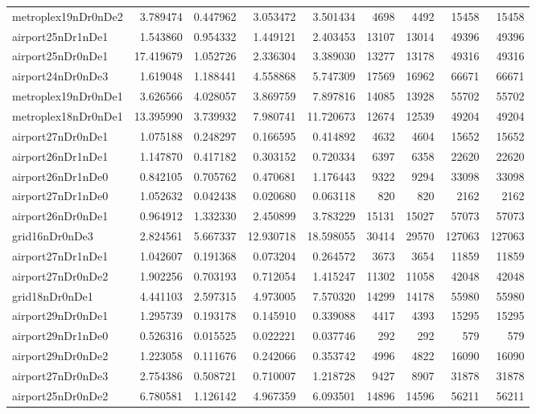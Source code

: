 \begin{longtable}{|l|r|r|r|r|r|r|r|r|}
metroplex19nDr0nDe2 & 3.789474 & 0.447962 & 3.053472 & 3.501434 & 4698 & 4492 & 15458 & 15458 \\
airport25nDr1nDe1 & 1.543860 & 0.954332 & 1.449121 & 2.403453 & 13107 & 13014 & 49396 & 49396 \\
airport25nDr0nDe1 & 17.419679 & 1.052726 & 2.336304 & 3.389030 & 13277 & 13178 & 49316 & 49316 \\
airport24nDr0nDe3 & 1.619048 & 1.188441 & 4.558868 & 5.747309 & 17569 & 16962 & 66671 & 66671 \\
metroplex19nDr0nDe1 & 3.626566 & 4.028057 & 3.869759 & 7.897816 & 14085 & 13928 & 55702 & 55702 \\
metroplex18nDr0nDe1 & 13.395990 & 3.739932 & 7.980741 & 11.720673 & 12674 & 12539 & 49204 & 49204 \\
airport27nDr0nDe1 & 1.075188 & 0.248297 & 0.166595 & 0.414892 & 4632 & 4604 & 15652 & 15652 \\
airport26nDr1nDe1 & 1.147870 & 0.417182 & 0.303152 & 0.720334 & 6397 & 6358 & 22620 & 22620 \\
airport26nDr1nDe0 & 0.842105 & 0.705762 & 0.470681 & 1.176443 & 9322 & 9294 & 33098 & 33098 \\
airport27nDr1nDe0 & 1.052632 & 0.042438 & 0.020680 & 0.063118 & 820 & 820 & 2162 & 2162 \\
airport26nDr0nDe1 & 0.964912 & 1.332330 & 2.450899 & 3.783229 & 15131 & 15027 & 57073 & 57073 \\
grid16nDr0nDe3 & 2.824561 & 5.667337 & 12.930718 & 18.598055 & 30414 & 29570 & 127063 & 127063 \\
airport27nDr1nDe1 & 1.042607 & 0.191368 & 0.073204 & 0.264572 & 3673 & 3654 & 11859 & 11859 \\
airport27nDr0nDe2 & 1.902256 & 0.703193 & 0.712054 & 1.415247 & 11302 & 11058 & 42048 & 42048 \\
grid18nDr0nDe1 & 4.441103 & 2.597315 & 4.973005 & 7.570320 & 14299 & 14178 & 55980 & 55980 \\
airport29nDr0nDe1 & 1.295739 & 0.193178 & 0.145910 & 0.339088 & 4417 & 4393 & 15295 & 15295 \\
airport29nDr1nDe0 & 0.526316 & 0.015525 & 0.022221 & 0.037746 & 292 & 292 & 579 & 579 \\
airport29nDr0nDe2 & 1.223058 & 0.111676 & 0.242066 & 0.353742 & 4996 & 4822 & 16090 & 16090 \\
airport27nDr0nDe3 & 2.754386 & 0.508721 & 0.710007 & 1.218728 & 9427 & 8907 & 31878 & 31878 \\
airport25nDr0nDe2 & 6.780581 & 1.126142 & 4.967359 & 6.093501 & 14896 & 14596 & 56211 & 56211 \\

\end{longtable}
